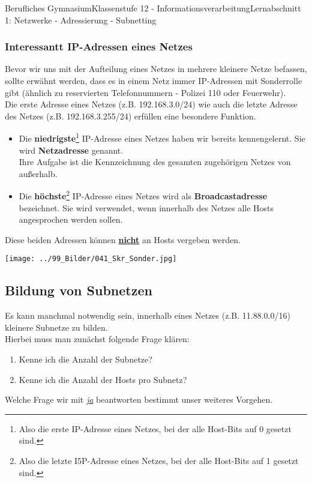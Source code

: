 \documentclass[11pt,oneside,openany,headings=optiontotoc,11pt,numbers=noenddot]{article}
\begin{document}
	\begin{worksheet}{Berufliches Gymnasium}{Klassenstufe 12 - Informationsverarbeitung}{Lernabschnitt 1: Netzwerke - Adressierung - Subnetting}
		\setcounter{section}{1}
		\setcounter{subsection}{2}
		\subsubsection*{Interessantt IP-Adressen eines Netzes}
		Bevor wir uns mit der Aufteilung eines Netzes in mehrere kleinere Netze befassen, sollte erwähnt werden, dass es in einem Netz immer IP-Adressen mit Sonderrolle gibt (ähnlich zu reservierten Telefonnummern - Polizei 110 oder Feuerwehr).\\
		Die erste Adresse eines Netzes (z.B. 192.168.3.0/24) wie auch die letzte Adresse des Netzes (z.B. 192.168.3.255/24) erfüllen eine besondere Funktion.
		\begin{itemize}[label=-]
			\item Die \textbf{niedrigste}\footnote{Also die erste IP-Adresse eines Netzes, bei der alle Host-Bits auf 0 gesetzt sind.} IP-Adresse eines Netzes haben wir bereits kennengelernt. Sie wird \textbf{Netzadresse} genannt.\\
			Ihre Aufgabe ist die Kennzeichnung des gesamten zugehörigen Netzes von außerhalb.
			\item Die \textbf{höchste}\footnote{Also die letzte I5P-Adresse eines Netzes, bei der alle Host-Bits auf 1 gesetzt sind.} IP-Adresse eines Netzes wird als \textbf{Broadcastadresse} bezeichnet. Sie wird verwendet, wenn innerhalb des Netzes alle Hosts angesprochen werden sollen.
		\end{itemize}
		Diese beiden Adressen können \underline{\textbf{nicht}} an Hosts vergeben werden.\\
		\par\noindent
		\texttt{[image: ../99\_Bilder/041\_Skr\_Sonder.jpg]}
		\subsection{Bildung von Subnetzen}
		Es kann manchmal notwendig sein, innerhalb eines Netzes (z.B. 11.88.0.0/16) kleinere Subnetze zu bilden.\\
		Hierbei muss man zunächst folgende Frage klären:
		\begin{enumerate}
			\item Kenne ich die Anzahl der Subnetze?
			\item Kenne ich die Anzahl der Hosts pro Subnetz?
		\end{enumerate}
		Welche Frage wir mit \textit{\underline{ja}} beantworten bestimmt unser weiteres Vorgehen.

\end{worksheet}
\end{document}
